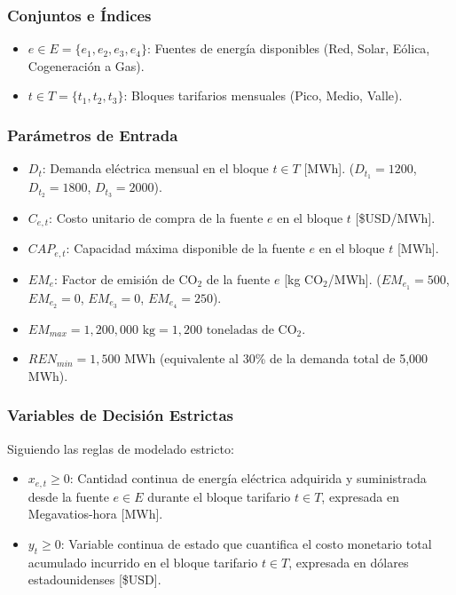 \documentclass[11pt,a4paper]{article}
\begin{document}
\subsubsection{Conjuntos e Índices}
\begin{itemize}
    \item $e \in E = \{e_1, e_2, e_3, e_4\}$: Fuentes de energía disponibles (Red, Solar, Eólica, Cogeneración a Gas).
    \item $t \in T = \{t_1, t_2, t_3\}$: Bloques tarifarios mensuales (Pico, Medio, Valle).
\end{itemize}

\subsubsection{Parámetros de Entrada}
\begin{itemize}
    \item $D_t$: Demanda eléctrica mensual en el bloque $t \in T$ [MWh]. ($D_{t_1} = 1200$, $D_{t_2} = 1800$, $D_{t_3} = 2000$).
    \item $C_{e,t}$: Costo unitario de compra de la fuente $e$ en el bloque $t$ [\$USD/MWh].
    \item $CAP_{e,t}$: Capacidad máxima disponible de la fuente $e$ en el bloque $t$ [MWh].
    \item $EM_e$: Factor de emisión de $\text{CO}_2$ de la fuente $e$ [kg $\text{CO}_2$/MWh]. ($EM_{e_1} = 500$, $EM_{e_2} = 0$, $EM_{e_3} = 0$, $EM_{e_4} = 250$).
    \item $EM_{max} = 1,200,000 \text{ kg} = 1,200 \text{ toneladas de } \text{CO}_2$.
    \item $REN_{min} = 1,500 \text{ MWh}$ (equivalente al 30\% de la demanda total de 5,000 MWh).
\end{itemize}

\subsubsection{Variables de Decisión Estrictas}
Siguiendo las reglas de modelado estricto:
\begin{itemize}
    \item $x_{e,t} \ge 0$: Cantidad continua de energía eléctrica adquirida y suministrada desde la fuente $e \in E$ durante el bloque tarifario $t \in T$, expresada en Megavatios-hora [MWh].
    \item $y_t \ge 0$: Variable continua de estado que cuantifica el costo monetario total acumulado incurrido en el bloque tarifario $t \in T$, expresada en dólares estadounidenses [\$USD].
\end{itemize}
\end{document}
